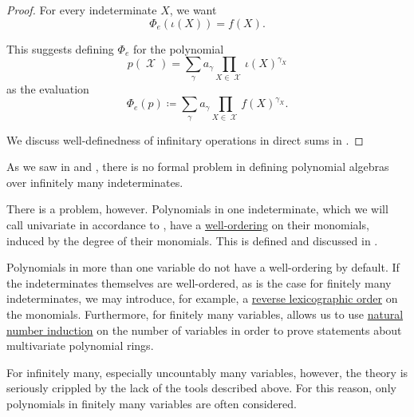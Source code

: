 \begin{proof}
  For every indeterminate \( X \), we want
  \begin{equation*}
    \Phi_e(\iota(X)) = f(X).
  \end{equation*}

  This suggests defining \( \Phi_e \) for the polynomial
  \begin{equation*}
    p(\mscrX) = \sum_\gamma a_\gamma \prod_{X \in \mscrX} \iota(X)^{\gamma_X}
  \end{equation*}
  as the evaluation
  \begin{equation*}
    \Phi_e(p) \coloneqq \sum_\gamma a_\gamma \prod_{X \in \mscrX} f(X)^{\gamma_X}.
  \end{equation*}

  We discuss well-definedness of infinitary operations in direct sums in .
\end{proof}

\begin{remark}\label{rem:polynomials_over_infinitely_many_indeterminates}
  As we saw in  and , there is no formal problem in defining polynomial algebras over infinitely many indeterminates.

  There is a problem, however. Polynomials in one indeterminate, which we will call univariate in accordance to , have a \hyperref[def:well_ordered_set]{well-ordering} on their monomials, induced by the degree of their monomials. This is defined and discussed in .

  Polynomials in more than one variable do not have a well-ordering by default. If the indeterminates themselves are well-ordered, as is the case for finitely many indeterminates, we may introduce, for example, a \hyperref[def:lexicographic_order]{reverse lexicographic order} on the monomials. Furthermore, for finitely many variables,  allows us to use \hyperref[rem:induction/peano_arithmetic]{natural number induction} on the number of variables in order to prove statements about multivariate polynomial rings.

  For infinitely many, especially uncountably many variables, however, the theory is seriously crippled by the lack of the tools described above. For this reason, only polynomials in finitely many variables are often considered.
\end{remark}

